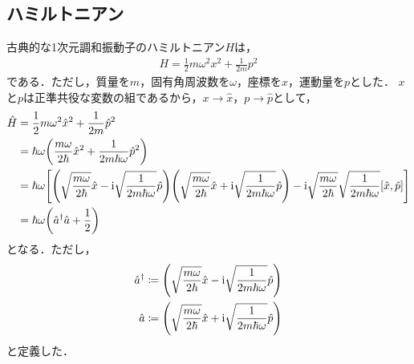 \documentclass{report}
\begin{document}
  \subsection{ハミルトニアン}
    古典的な1次元調和振動子のハミルトニアン$H$は，
    \begin{align}
      H = \frac{1}{2}m\omega^2x^2 + \frac{1}{2m}p^2
    \end{align}
    である．ただし，質量を$m$，固有角周波数を$\omega$，座標を$x$，運動量を$p$とした．
    $x$と$p$は正準共役な変数の組であるから，$x\to \hat{x}$，$p \to \hat{p}$として，
    \begin{align}
      \hat{H} &= \frac{1}{2}m\omega^2\hat{x}^2 + \frac{1}{2m}\hat{p}^2 \label{harmonic-oscillator-hamiltonian}\\ 
      &= \hbar\omega\qty(\frac{m\omega}{2\hbar}\hat{x}^2 + \frac{1}{2m\hbar\omega}\hat{p}^2) \\ 
      &= \hbar\omega\qty[\qty(\sqrt{\frac{m\omega}{2\hbar}}\hat{x} - \mathrm{i}\sqrt{\frac{1}{2m\hbar\omega}}\hat{p})\qty(\sqrt{\frac{m\omega}{2\hbar}}\hat{x} + \mathrm{i}\sqrt{\frac{1}{2m\hbar\omega}}\hat{p}) - \mathrm{i}\sqrt{\frac{m\omega}{2\hbar}}\sqrt{\frac{1}{2m\hbar\omega}}\qty[\hat{x}, \hat{p}]] \\ 
      &= \hbar\omega\qty(\hat{a}^{\dag}\hat{a} + \frac{1}{2})
    \end{align}
    となる．ただし，
    \begin{align}
      \hat{a}^{\dag} &\coloneqq \qty(\sqrt{\frac{m\omega}{2\hbar}}\hat{x} - \mathrm{i}\sqrt{\frac{1}{2m\hbar\omega}}\hat{p}) \\ 
      \hat{a} &\coloneqq \qty(\sqrt{\frac{m\omega}{2\hbar}}\hat{x} + \mathrm{i}\sqrt{\frac{1}{2m\hbar\omega}}\hat{p})
    \end{align}
    と定義した．
\end{document}
